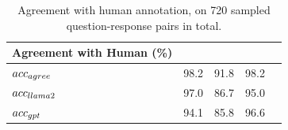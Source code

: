\def \TabAutoEvalAgreement{
\begin{table}[ht]
\caption{
Agreement with human annotation, on 720 sampled question-response pairs in total.
}
\label{table:main:huamneval}
\centering
\begin{small}
\begin{tabular}{l|cccc}
\toprule
 Agreement with Human (\%) & \datasetcoqa &  \datasetnqopen & \datasettrivia\\
\midrule
$\Acc_{agree}$ & 98.2 & 91.8 & 98.2\\
$\Acc_{llama2}$ & 97.0 & 86.7 & 95.0\\
$\Acc_{gpt}$ & 94.1 & 85.8 & 96.6 \\
\bottomrule
\end{tabular}
\end{small}
\end{table}
}
\TabAutoEvalAgreement
